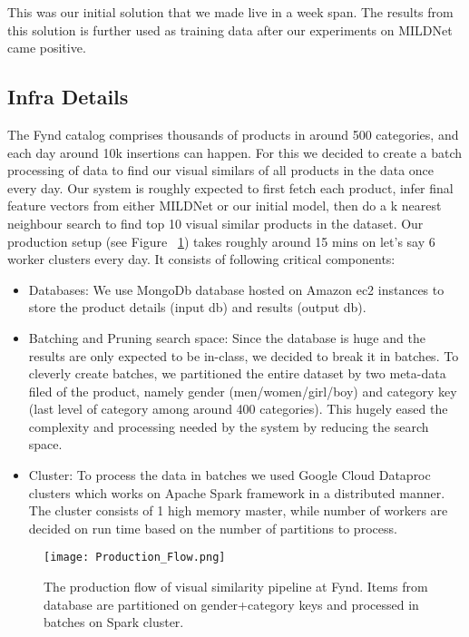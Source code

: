 \documentclass[10pt,twocolumn,letterpaper]{article}
\begin{document}
This was our initial solution that we made live in a week span. The results from this solution is further used as training data after our experiments on MILDNet came positive. 
\vspace{-1mm}
\subsection{Infra Details}
The Fynd catalog comprises thousands of products in around 500 categories, and each day around 10k insertions can happen. For this we decided to create a batch processing of data to find our visual similars of all products in the data once every day. Our system is roughly expected to first fetch each product, infer final feature vectors from either MILDNet or our initial model, then do a k nearest neighbour search to find top 10 visual similar products in the dataset. Our production setup (see Figure ~\ref{fig:production_flow}) takes roughly around 15 mins on let's say 6 worker clusters every day. It consists of following critical components:\vspace{-2mm}
\begin{itemize}
\item Databases: We use MongoDb database hosted on Amazon ec2 instances to store the product details (input db) and results (output db). 
\item Batching and Pruning search space: Since the database is huge and the results are only expected to be in-class, we decided to break it in batches. To cleverly create batches, we partitioned the entire dataset by two meta-data filed of the product, namely gender (men/women/girl/boy) and category key (last level of category among around 400 categories). This hugely eased the complexity and processing needed by the system by reducing the search space.
\item Cluster: To process the data in batches we used Google Cloud Dataproc clusters which works on Apache Spark framework in a distributed manner. The cluster consists of 1 high memory master, while number of workers are decided on run time based on the number of partitions to process.
\end{itemize}

\begin{figure}[htp]
\centering
\texttt{[image: Production\_Flow.png]}
\caption{The production flow of visual similarity pipeline at Fynd. Items from database are partitioned on gender+category keys and processed in batches on Spark cluster.}
\label{fig:production_flow}
\end{figure}
\end{document}
